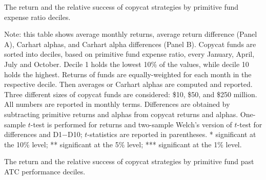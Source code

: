 \documentclass[12pt, a4]{article}
\begin{document}
\thispagestyle{empty}
\begin{landscape}

	\begin{table*}[p] %
		\centering
		\ssmall
		\newcommand{\dspacing}{1ex} %
		\newcommand{\panelspacing}{1.5ex} %
		\newcommand{\decilename}[1]{\multirow{2}{*}{#1}} %
		\newcommand{\mc}[3]{\multicolumn{#1}{#2}{#3}}
		\begin{threeparttable}
			\centering
			\caption{The return and the relative success of copycat strategies by primitive fund expense ratio deciles.}
			
			
			
			\label{tab:expense_ratio_deciles}%
			\begin{tablenotes}
				\tiny
				\item Note: this table shows average monthly returns, average return difference (Panel A), Carhart alphas, and Carhart alpha differences (Panel B). Copycat funds are sorted into deciles, based on primitive fund expense ratio, every January, April, July and October. Decile 1 holds the lowest 10\% of the values, while decile 10 holds the highest. Returns of funds are equally-weighted for each month in the respective decile. Then averages or Carhart alphas are computed and reported. Three different sizes of copycat funds are considered: \$10, \$50, and \$250 million. All numbers are reported in monthly terms. Differences are obtained by subtracting primitive returns and alphas from copycat returns and alphas. One-sample $t$-test is performed for returns and two-sample Welch's version of $t$-test for differences and D1$-$D10; $t$-statistics are reported in parentheses. * significant at the 10\% level; ** significant at the 5\% level; *** significant at the 1\% level.
			\end{tablenotes}
		\end{threeparttable}
	\end{table*}
	
	\begin{table*}[p] %
		\centering
		\ssmall
		\newcommand{\dspacing}{1ex} %
		\newcommand{\panelspacing}{1.5ex} %
		\newcommand{\decilename}[1]{\multirow{2}{*}{#1}} %
		\newcommand{\mc}[3]{\multicolumn{#1}{#2}{#3}}
		\begin{threeparttable}
			\centering
			\caption{The return and the relative success of copycat strategies by primitive fund past \textsc{ATC} performance deciles.}
			

\end{threeparttable}
\end{table*}
\end{landscape}
\end{document}
